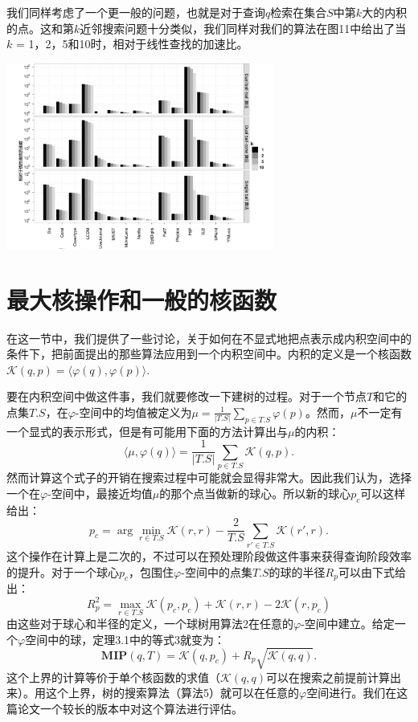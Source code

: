 \documentclass[twocolumn]{article}
\begin{document}
我们同样考虑了一个更一般的问题，也就是对于查询$q$检索在集合$S$中第$k$大的内积的点。这和第$k$近邻搜索问题十分类似，我们同样对我们的算法在图11中给出了当$k$ = 1，2，5和10时，相对于线性查找的加速比。

\includegraphics[width=250pt,clip,trim=0 0 0 0]{fig11.jpg}

\section{最大核操作和一般的核函数}
在这一节中，我们提供了一些讨论，关于如何在不显式地把点表示成内积空间中的条件下，把前面提出的那些算法应用到一个内积空间中。内积的定义是一个核函数$\mathcal{K}(q,p)=\langle \varphi(q),\varphi(p) \rangle.$

要在内积空间中做这件事，我们就要修改一下建树的过程。对于一个节点$T$和它的点集$T.S$，在$\varphi$-空间中的均值被定义为$\mu=\frac{1}{|T.S|}\sum_{p\in T.S}\varphi(p)$。然而，$\mu$不一定有一个显式的表示形式，但是有可能用下面的方法计算出与$\mu$的内积：
\begin{equation*}
\langle\mu,\varphi(q)\rangle = \frac{1}{|T.S|}\sum_{p \in T.S}\mathcal{K}(q,p).
\end{equation*}
然而计算这个式子的开销在搜索过程中可能就会显得非常大。因此我们认为，选择一个在$\varphi$-空间中，最接近均值$\mu$的那个点当做新的球心。所以新的球心$p_c$可以这样给出：
\begin{equation}
p_c = \arg\min_{r\in T.S}\mathcal{K}(r,r) - \frac{2}{T.S}\sum_{r'\in T.S}\mathcal{K}(r',r).
\end{equation}
这个操作在计算上是二次的，不过可以在预处理阶段做这件事来获得查询阶段效率的提升。对于一个球心$p_c$，包围住$\varphi$-空间中的点集$T.S$的球的半径$R_p$可以由下式给出：
\begin{equation}
R_p^2 = \max_{r\in T.S}\mathcal{K}(p_c,p_c)+\mathcal{K}(r,r) - 2\mathcal{K}(r,p_c)
\end{equation}
由这些对于球心和半径的定义，一个球树用算法2在任意的$\varphi$-空间中建立。给定一个$\varphi$空间中的球，定理3.1中的等式3就变为：
\begin{equation}
\mathbf{MIP}(q,T) = \mathcal{K}(q,p_c) + R_p\sqrt{\mathcal{K}(q,q)}.
\end{equation}
这个上界的计算等价于单个核函数的求值（$\mathcal{K}(q,q)$可以在搜索之前提前计算出来）。用这个上界，树的搜索算法（算法5）就可以在任意的$\varphi$空间进行。我们在这篇论文一个较长的版本中对这个算法进行评估。
\end{document}

